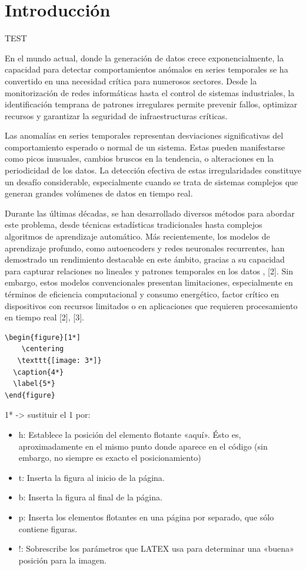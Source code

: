 \chapter{Introducción}
TEST

En el mundo actual, donde la generación de datos crece exponencialmente, la capacidad para detectar comportamientos anómalos en series temporales se ha convertido en una necesidad crítica para numerosos sectores. Desde la monitorización de redes informáticas hasta el control de sistemas industriales, la identificación temprana de patrones irregulares permite prevenir fallos, optimizar recursos y garantizar la seguridad de infraestructuras críticas.

Las anomalías en series temporales representan desviaciones significativas del comportamiento esperado o normal de un sistema. Estas pueden manifestarse como picos inusuales, cambios bruscos en la tendencia, o alteraciones en la periodicidad de los datos. La detección efectiva de estas irregularidades constituye un desafío considerable, especialmente cuando se trata de sistemas complejos que generan grandes volúmenes de datos en tiempo real.

Durante las últimas décadas, se han desarrollado diversos métodos para abordar este problema, desde técnicas estadísticas tradicionales hasta complejos algoritmos de aprendizaje automático. Más recientemente, los modelos de aprendizaje profundo, como autoencoders y redes neuronales recurrentes, han demostrado un rendimiento destacable en este ámbito, gracias a su capacidad para capturar relaciones no lineales y patrones temporales en los datos \cite{cherdo_time_2023}, [2]. Sin embargo, estos modelos convencionales presentan limitaciones, especialmente en términos de eficiencia computacional y consumo energético, factor crítico en dispositivos con recursos limitados o en aplicaciones que requieren procesamiento en tiempo real [2], [3].
\begin{verbatim}
\begin{figure}[1*]
	\centering
   \texttt{[image: 3*]}
  \caption{4*}
  \label{5*}
\end{figure}
\end{verbatim}
1* -> sustituir el 1 por:

\begin{itemize}
    \item h:	Establece la posición del elemento flotante «aquí». Ésto es, aproximadamente en el mismo punto donde aparece en el código (sin embargo, no siempre es exacto el posicionamiento)
    \item t:	Inserta la figura al inicio de la página.
    \item b:	Inserta la figura al final de la página.
    \item p:	Inserta los elementos flotantes en una página por separado, que sólo contiene figuras.
    \item !:	Sobrescribe los parámetros que LATEX usa para determinar una «buena» posición para la imagen.
\end{itemize}


